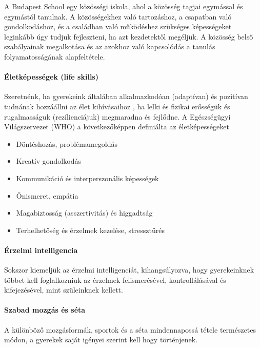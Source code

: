 A Budapest School egy közösségi iskola, ahol a közösség tagjai egymással és egymástól tanulnak. A közösségekhez való tartozáshoz, a csapatban való gondolkodáshoz, és a családban való működéshez szükséges képességeket leginkább úgy tudjuk fejleszteni, ha azt kezdetektől megéljük. A közösség belső szabályainak megalkotása és az azokhoz való kapcsolódás a tanulás folyamatosságának alapfeltétele.

\paragraph{Életképességek (life skills)}

Szeretnénk, ha gyerekeink általában alkalmazkodóan (adaptívan) és pozitívan tudnának hozzáállni az élet kihívásaihoz , ha lelki és fizikai erősségük és rugalmasságuk (rezílienciájuk) megmaradna és fejlődne.   A Egészségügyi Világszervezet (WHO) a következőképpen definiálta \citep{oecd99lifeskills} az életképességeket
\begin{itemize}
\item Döntéshozás, problémamegoldás

\item Kreatív gondolkodás

\item Kommunikáció és interperszonális képességek

\item Önismeret, empátia

\item Magabiztosság (asszertivitás) és higgadtság

\item Terhelhetőség és érzelmek kezelése, stressztűrés
\end{itemize}
\paragraph{Érzelmi intelligencia}

Sokszor kiemeljük az érzelmi intelligenciát, kihangsúlyozva, hogy gyerekeinknek többet kell foglalkozniuk az érzelmek felismerésével, kontrollálásával és kifejezésével, mint szüleinknek kellett.

\paragraph{Szabad mozgás és séta}

A különböző mozgásformák, sportok és a séta mindennapossá tétele természetes módon, a gyerekek saját igényei szerint kell hogy történjenek.

